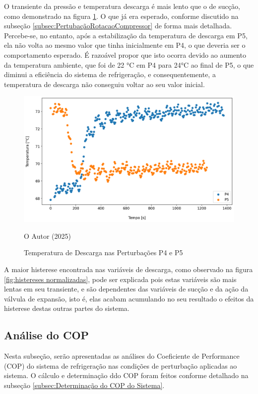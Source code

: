 O transiente da pressão e temperatura descarga é mais lento que o de sucção, como demonstrado na figura \ref{fig:TempDescargaSubidaeDescida}. O que já era esperado, conforme discutido na subseção \ref{subsec:PertubaçãoRotacaoCompressor} de forma mais detalhada.
Percebe-se, no entanto, após a estabilização da temperatura de descarga em P5, ela não volta ao mesmo valor que tinha inicialmente em P4, o que deveria ser o comportamento esperado. É razoável propor que isto ocorra devido ao aumento da temperatura ambiente, que foi de 22 °C em P4 para 24°C ao final de P5, o que diminui a eficiência do sistema de refrigeração, e consequentemente, a temperatura de descarga não conseguiu voltar ao seu valor inicial.
\newpage
\begin{figure}[h]
    \centering
    \includegraphics[width=1\linewidth]{FigurasdoTexto/Temperatura de Descarga.png}
    \caption{Temperatura de Descarga  nas Perturbações P4 e P5}
    \label{fig:TempDescargaSubidaeDescida}
    {\footnotesize O Autor (2025)}
\end{figure}

A maior histerese encontrada nas variáveis de descarga, como observado na figura \ref{fig:histereses normalizadas}, pode ser explicada pois estas variáveis são mais lentas em seu transiente, e são dependentes das variáveis de sucção e da ação da válvula de expansão, isto é, elas acabam acumulando no seu resultado o efeitos da histerese destas outras partes do sistema. 

\subsection{Análise do COP}

Nesta subseção, serão apresentadas as análises do Coeficiente de Performance (COP) do sistema de refrigeração nas condições de perturbação aplicadas ao sistema. O cálculo e determinação ddo COP foram feitos conforme detalhado na subseção \ref{subsec:Determinação do COP do Sistema}.

